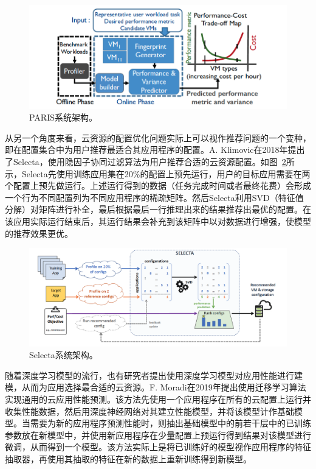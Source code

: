 \begin{figure}[h]
    \centerline{\includegraphics[width=\textwidth]{figures/paris-arch.png}}
    \caption{PARIS系统架构。}
    \label{paris_arch}
\end{figure}

从另一个角度来看，云资源的配置优化问题实际上可以视作推荐问题的一个变种，即在配置集合中为用户推荐最适合其应用程序的配置。A. Klimovic在2018年提出了Selecta\parencite{klimovic2018selecta}，使用隐因子协同过滤算法为用户推荐合适的云资源配置。如图~\ref{selecta_arch}所示，Selecta先使用训练应用集在20\%的配置上预先运行，用户的目标应用需要在两个配置上预先做运行。上述运行得到的数据（任务完成时间或者最终花费）会形成一个行为不同配置列为不同应用程序的稀疏矩阵。然后Selecta利用SVD（特征值分解）对矩阵进行补全，最后根据最后一行推理出来的结果推荐出最优的配置。在该应用实际运行结束后，其运行结果会补充到该矩阵中以对数据进行增强，使模型的推荐效果更优。

\begin{figure}[h]
    \centerline{\includegraphics[width=\textwidth]{figures/selecta-arch.png}}
    \caption{Selecta系统架构。}
    \label{selecta_arch}
\end{figure}

随着深度学习模型的流行，也有研究者提出使用深度学习模型对应用性能进行建模，从而为应用选择最合适的云资源。F. Moradi\parencite{moradi2019performance}在2019年提出使用迁移学习算法实现通用的云应用性能预测。该方法先使用一个应用程序在所有的云配置上运行并收集性能数据，然后用深度神经网络对其建立性能模型，并将该模型计作基础模型。当需要为新的应用程序预测性能时，则抽出基础模型中的前若干层中的已训练参数放在新模型中，并使用新应用程序在少量配置上预运行得到结果对该模型进行微调，从而得到一个模型。该方法实际上是将已训练好的模型视作应用程序的特征抽取器，再使用其抽取的特征在新的数据上重新训练得到新模型。


